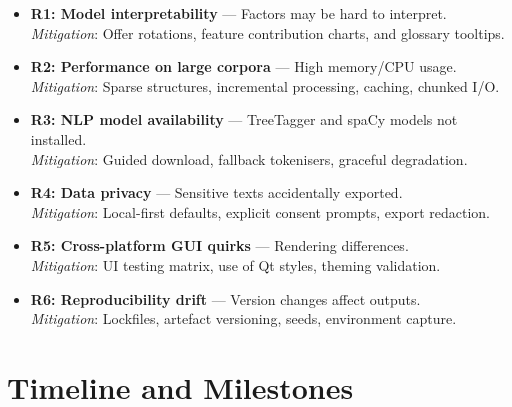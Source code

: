 \begin{itemize}
    \item \textbf{R1: Model interpretability} — Factors may be hard to interpret. \\
          \emph{Mitigation}: Offer rotations, feature contribution charts, and glossary tooltips.
    \item \textbf{R2: Performance on large corpora} — High memory/CPU usage. \\
          \emph{Mitigation}: Sparse structures, incremental processing, caching, chunked I/O.
    \item \textbf{R3: NLP model availability} — TreeTagger and spaCy models not installed. \\
          \emph{Mitigation}: Guided download, fallback tokenisers, graceful degradation.
    \item \textbf{R4: Data privacy} — Sensitive texts accidentally exported. \\
          \emph{Mitigation}: Local-first defaults, explicit consent prompts, export redaction.
    \item \textbf{R5: Cross-platform GUI quirks} — Rendering differences. \\
          \emph{Mitigation}: UI testing matrix, use of Qt styles, theming validation.
    \item \textbf{R6: Reproducibility drift} — Version changes affect outputs. \\
          \emph{Mitigation}: Lockfiles, artefact versioning, seeds, environment capture.
\end{itemize}

\section{Timeline and Milestones}

